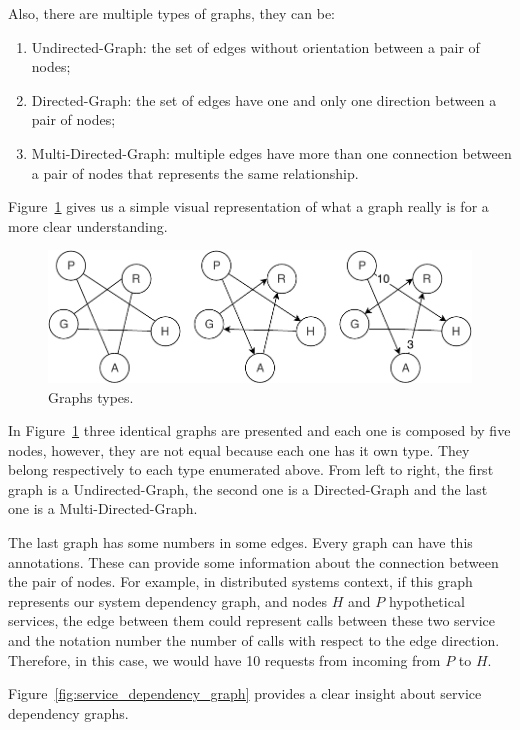 Also, there are multiple types of graphs, they can be:

\begin{enumerate}
    \item Undirected-Graph: the set of edges without orientation between a pair of nodes;
    \item Directed-Graph: the set of edges have one and only one direction between a pair of nodes;
    \item Multi-Directed-Graph: multiple edges have more than one connection between a pair of nodes that represents the same relationship.
\end{enumerate}

Figure~\ref{fig:graphs_types} gives us a simple visual representation of what a graph really is for a more clear understanding.

\begin{figure}[H]
    \centering
    \includegraphics[width=1.00\textwidth]{images/graph_representations.pdf}
    \caption{Graphs types.}
    \label{fig:graphs_types}
\end{figure}

In Figure~\ref{fig:graphs_types} three identical graphs are presented and each one is composed by five nodes, however, they are not equal because each one has it own type. They belong respectively to each type enumerated above. From left to right, the first graph is a Undirected-Graph, the second one is a Directed-Graph and the last one is a Multi-Directed-Graph.

The last graph has some numbers in some edges. Every graph can have this annotations. These can provide some information about the connection between the pair of nodes. For example, in distributed systems context, if this graph represents our system dependency graph, and nodes $H$ and $P$ hypothetical services, the edge between them could represent calls between these two service and the notation number the number of calls with respect to the edge direction. Therefore, in this case, we would have 10 requests from incoming from $P$ to $H$.

Figure~\ref{fig:service_dependency_graph} provides a clear insight about service dependency graphs.

